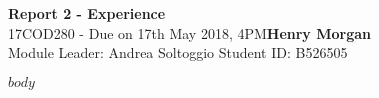 \documentclass[a4paper, 11pt]{article}
\begin{document}
\noindent
\large\textbf{Report 2 - Experience} \hfill  \\
\normalsize 17COD280 - Due on 17th May 2018, 4PM\hfill\textbf{Henry Morgan} \\
Module Leader: Andrea Soltoggio 
\hfill Student ID: B526505

$body$
\end{document}

